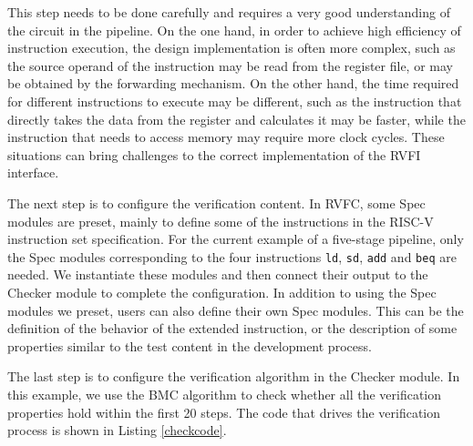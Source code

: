 \documentclass[conference]{IEEEtran}
\theoremstyle{definition}
\begin{document}
This step needs to be done carefully and requires a very good understanding of the circuit in the pipeline.
On the one hand, in order to achieve high efficiency of instruction execution, the design implementation is often more complex, such as the source operand of the instruction may be read from the register file, or may be obtained by the forwarding mechanism.
On the other hand, the time required for different instructions to execute may be different, such as the instruction that directly takes the data from the register and calculates it may be faster, while the instruction that needs to access memory may require more clock cycles.
These situations can bring challenges to the correct implementation of the RVFI interface.

The next step is to configure the verification content.
In RVFC, some Spec modules are preset, mainly to define some of the instructions in the RISC-V instruction set specification.
For the current example of a five-stage pipeline, only the Spec modules corresponding to the four instructions \verb|ld|, \verb|sd|, \verb|add| and \verb|beq| are needed.
We instantiate these modules and then connect their output to the Checker module to complete the configuration.
In addition to using the Spec modules we preset, users can also define their own Spec modules.
This can be the definition of the behavior of the extended instruction, or the description of some properties similar to the test content in the development process.

The last step is to configure the verification algorithm in the Checker module.
In this example, we use the BMC algorithm to check whether all the verification properties hold within the first 20 steps.
The code that drives the verification process is shown in Listing \ref{checkcode}.
\end{document}
